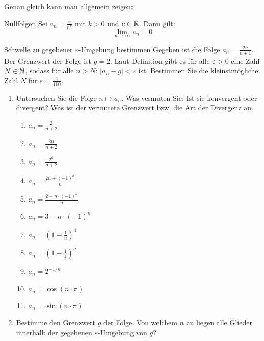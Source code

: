 Genau gleich kann man allgemein zeigen:
\begin{satz}{Nullfolgen}{}
	Sei $a_n =\frac{c}{n^k}$  mit $k>0$ und $c\in \mathbb{R}$. Dann gilt:
	$$\lim_{n \rightarrow \infty} a_n = 0$$
\end{satz}
\clearpage
\begin{bsp}
	{Schwelle zu gegebener $\varepsilon$-Umgebung bestimmen}{}
	Gegeben ist die Folge $a_n = \frac{2n}{n+1}$. Der Grenzwert der Folge ist $g=2$. Laut Definition gibt es für alle $\varepsilon>0$ eine Zahl $N\in \mathbb{N}$, sodass für alle $n>N$:  $|a_n-g|<\varepsilon$ ist. Bestimmen Sie die kleinstmögliche Zahl $N$ für $\varepsilon= \frac{1}{100}$.
	\vspace*{14cm}
\end{bsp}
\clearpage
\begin{ueb}{}{}
	\begin{enumerate}
		\item
		      Untersuchen Sie die Folge $n \mapsto a_n$. Was vermuten Sie: Ist sie konvergent oder divergent? Was ist der vermutete Grenzwert bzw. die Art der Divergenz an.

		      \begin{enumerate}
			      \item $a_n = \frac{2}{n+2}$
			      \item $a_n = \frac{2n}{n+2}$
			      \item $a_n = \frac{2^n}{n+2}$
			      \item $a_n = \frac{2n + (-1)^n}{n}$
			      \item $a_n = \frac{2 + n \cdot (-1)^n}{n}$
			      \item $a_n = 3 - n \cdot (-1)^n$
			      \item $a_n = \left(1 - \frac{1}{n}\right)^4$
			      \item $a_n = \left(1 - \frac{1}{4}\right)^n$
			      \item $a_n = 2^{-1/n}$
			      \item $a_n = \cos(n\cdot \pi)$
			      \item $a_n = \sin(n\cdot \pi)$
		      \end{enumerate}



		\item Bestimme den Grenzwert $g$ der Folge. Von welchem $n$ an liegen alle Glieder innerhalb der gegebenen $\varepsilon$-Umgebung von $g$?


\end{enumerate}
\end{ueb}
